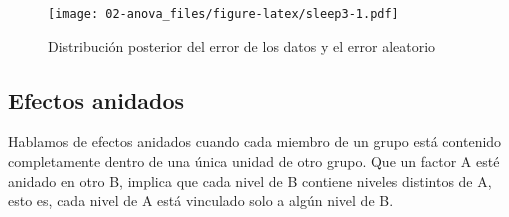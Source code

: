 \documentclass[
]{book}
\newenvironment{Shaded}{\begin{snugshade}}{\end{snugshade}}
\newcommand{\AttributeTok}[1]{\textcolor[rgb]{0.77,0.63,0.00}{#1}}
\newcommand{\ConstantTok}[1]{\textcolor[rgb]{0.00,0.00,0.00}{#1}}
\newcommand{\ControlFlowTok}[1]{\textcolor[rgb]{0.13,0.29,0.53}{\textbf{#1}}}
\newcommand{\DecValTok}[1]{\textcolor[rgb]{0.00,0.00,0.81}{#1}}
\newcommand{\FunctionTok}[1]{\textcolor[rgb]{0.00,0.00,0.00}{#1}}
\newcommand{\NormalTok}[1]{#1}
\newcommand{\OtherTok}[1]{\textcolor[rgb]{0.56,0.35,0.01}{#1}}
\newcommand{\SpecialCharTok}[1]{\textcolor[rgb]{0.00,0.00,0.00}{#1}}
\newcommand{\StringTok}[1]{\textcolor[rgb]{0.31,0.60,0.02}{#1}}
\begin{document}
\begin{Shaded}
\end{Shaded}

\begin{figure}
\centering
\texttt{[image: 02-anova\_files/figure-latex/sleep3-1.pdf]}
\caption{\label{fig:sleep3}Distribución posterior del error de los datos y el error aleatorio}
\end{figure}

\hypertarget{efectos-anidados}{%
\subsection{Efectos anidados}\label{efectos-anidados}}

Hablamos de efectos anidados cuando cada miembro de un grupo está contenido completamente dentro de una única unidad de otro grupo. Que un factor A esté anidado en otro B, implica que cada nivel de B contiene niveles distintos de A, esto es, cada nivel de A está vinculado solo a algún nivel de B.
\end{document}
